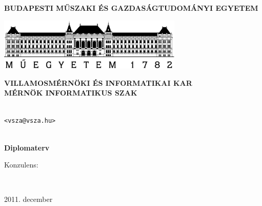 \begin{center}

\textbf{BUDAPESTI MŰSZAKI ÉS GAZDASÁGTUDOMÁNYI EGYETEM}

\medskip

\includegraphics[width=8.79cm]{images/bme.pdf}

\medskip

\textbf{VILLAMOSMÉRNÖKI ÉS INFORMATIKAI KAR\\MÉRNÖK INFORMATIKUS SZAK}

 \vspace{2cm}
 \Large\textbf{\cim}

 \vspace{6mm}
 \textbf{\nev} \\
 \texttt{<vsza@vsza.hu>} \\ \strut \\

 \Large\textbf{Diplomaterv}

\end{center}

\vfill

Konzulens:

\begin{center}
\konzulens\\ \konzbeoszt

\vspace{96pt}

2011. december
\end{center}

